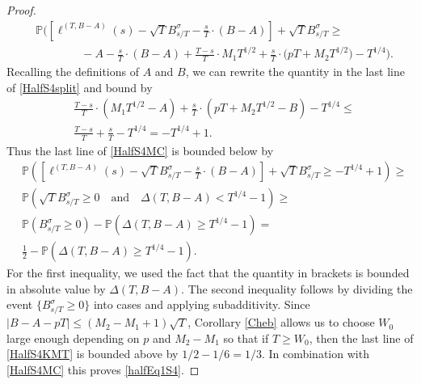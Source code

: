 \begin{proof}
\begin{equation}
\begin{split}
	& \mathbb{P}\bigg( \left[\ell^{(T,B-A)}(s) - \sqrt{T} B^\sigma_{s/T} - \frac{s}{T}\cdot(B-A)\right] + \sqrt{T}B^\sigma_{s/T} \geq \\
	&\qquad\qquad -A-\frac{s}{T}\cdot(B-A) +\frac{T-s}{T} \cdot M_1 T^{1/2} + \frac{s}{T} \cdot \big(p T + M_2 T^{1/2}\big) - T^{1/4} \bigg).
	\end{split}
	\end{equation}
	Recalling the definitions of $A$ and $B$, we can rewrite the quantity in the last line of \eqref{HalfS4split} and bound by
	\begin{align*}
	&\frac{T-s}{T}\cdot(M_1T^{1/2}-A) + \frac{s}{T}\cdot(pT + M_2T^{1/2} - B) - T^{1/4} \leq \\
	& \frac{T-s}{T} + \frac{s}{T} - T^{1/4} = -T^{1/4} + 1.
	\end{align*}
	Thus the last line of \eqref{HalfS4MC} is bounded below by
	\begin{equation}\label{HalfS4KMT}
	\begin{split}
	& \mathbb{P}\left( \left[\ell^{(T,B-A)}(s) - \sqrt{T} B^\sigma_{s/T} - \frac{s}{T}\cdot(B-A)\right] + \sqrt{T}B^\sigma_{s/T} \geq -T^{1/4} + 1 \right) \geq\\
	& \mathbb{P}\left( \sqrt{T}B^\sigma_{s/T} \geq 0 \quad \mathrm{and} \quad \Delta(T,B-A) < T^{1/4} - 1 \right) \geq\\
	& \mathbb{P}\left( B^\sigma_{s/T} \geq 0 \right) - \mathbb{P}\left( \Delta(T,B-A) \geq T^{1/4} - 1 \right) =\\
	& \frac{1}{2} - \mathbb{P}\left( \Delta(T,B-A) \geq T^{1/4} - 1 \right).
	\end{split}
	\end{equation}
	For the first inequality, we used the fact that the quantity in brackets is bounded in absolute value by $\Delta(T,B-A)$. The second inequality follows by dividing the event $\{B^\sigma_{s/T}\geq 0\}$ into cases and applying subadditivity. Since $|B-A-pT|\leq (M_2-M_1+1)\sqrt{T}$, Corollary \ref{Cheb} allows us to choose $W_0$ large enough depending on $p$ and $M_2-M_1$ so that if $T \geq W_0$, then the last line of \eqref{HalfS4KMT} is bounded above by $1/2 - 1/6 = 1/3$. In combination with \eqref{HalfS4MC} this proves \eqref{halfEq1S4}.
\end{proof}

